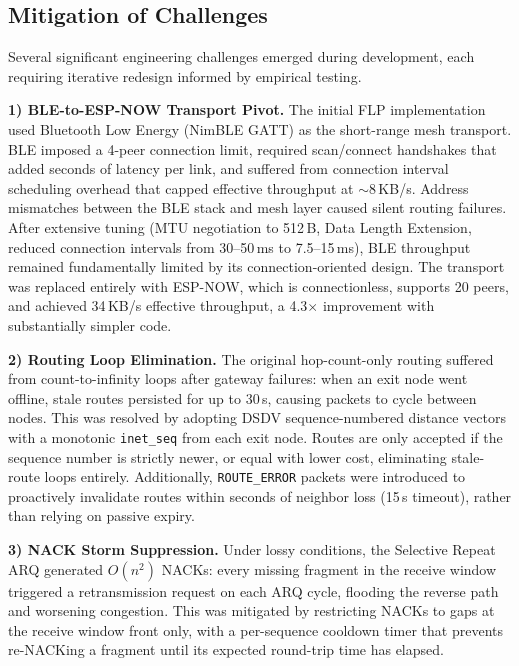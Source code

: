 \documentclass[conference]{IEEEtran}
\begin{document}
\subsection{Mitigation of Challenges}

Several significant engineering challenges emerged during development, each requiring iterative redesign informed by empirical testing.

\textbf{1) BLE-to-ESP-NOW Transport Pivot.}
The initial FLP implementation used Bluetooth Low Energy (NimBLE GATT) as the short-range mesh transport. BLE imposed a 4-peer connection limit, required scan/connect handshakes that added seconds of latency per link, and suffered from connection interval scheduling overhead that capped effective throughput at $\sim$8\,KB/s. Address mismatches between the BLE stack and mesh layer caused silent routing failures. After extensive tuning (MTU negotiation to 512\,B, Data Length Extension, reduced connection intervals from 30--50\,ms to 7.5--15\,ms), BLE throughput remained fundamentally limited by its connection-oriented design. The transport was replaced entirely with ESP-NOW, which is connectionless, supports 20 peers, and achieved 34\,KB/s effective throughput, a 4.3$\times$ improvement with substantially simpler code.

\textbf{2) Routing Loop Elimination.}
The original hop-count-only routing suffered from count-to-infinity loops after gateway failures: when an exit node went offline, stale routes persisted for up to 30\,s, causing packets to cycle between nodes. This was resolved by adopting DSDV sequence-numbered distance vectors with a monotonic \texttt{inet\_seq} from each exit node. Routes are only accepted if the sequence number is strictly newer, or equal with lower cost, eliminating stale-route loops entirely. Additionally, \texttt{ROUTE\_ERROR} packets were introduced to proactively invalidate routes within seconds of neighbor loss (15\,s timeout), rather than relying on passive expiry.

\textbf{3) NACK Storm Suppression.}
Under lossy conditions, the Selective Repeat ARQ generated $O(n^2)$ NACKs: every missing fragment in the receive window triggered a retransmission request on each ARQ cycle, flooding the reverse path and worsening congestion. This was mitigated by restricting NACKs to gaps at the receive window front only, with a per-sequence cooldown timer that prevents re-NACKing a fragment until its expected round-trip time has elapsed.
\end{document}
